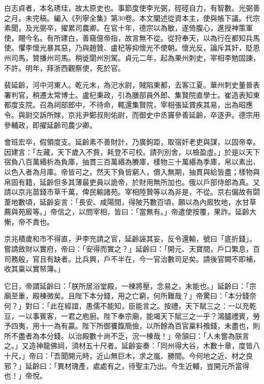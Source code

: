 
\begin{pinyinscope}

 白志貞者，本名琇珪，故太原史也。事節度使李光弼，硜硜自力，有智數。光弼善之月。未完稿。編入《列寧全集》第30卷。本文闡述從資本主，使與帳下議。代宗素聞，及光弼卒，擢累司農卿。在官十年，德宗以為敏，遂倚腹心，進授神策軍使，賜今名。有所建白，善窺億帝指，故言無不從。從狩奉天，以為行在都知兵馬使。懼李懷光暴其惡，乃與趙贊、盧杞等抑懷光不使朝。懷光反，論斥其奸，貶恩州司馬，贊播州司馬。稍徙閬州別駕。貞元二年，起為果州刺史，宰相李勉固諫，不許。明年，拜浙西觀察使，死於官。



 裴延齡，河中河東人。乾元末，為汜水尉，賊陷東都，去客江夏。華州刺史董晉表署判官，稍遷太常博士。盧杞秉政，引為膳部員外郎、集賢院直學士。崔造表知東都度支院。召為祠部郎中，不待命，輒還集賢院，宰相張延賞疾其易，出為昭應令。與尉交訴所賕，京兆尹鄭叔則佑尉，而御史中丞竇參善延齡，卒逐尹。德宗用參輔政，即擢延齡司農少卿。



 會班宏卒，假領度支。延齡素不善財計，乃廣鉤距，取宿奸老吏與謀，以固帝幸。因建言：「左藏，天下歲入不貲，耗登不可校。請列別舍，以檢盈虛。」於是以天下宿負八百萬緡析為負庫，抽貫三百萬緡為賸庫，樣物三十萬緡為季庫，帛以素出、以色入者為月庫。帝皆可之。然天下負皆窮人，償入無期，抽貫與給皆盡；樣物與帛固有籍，延齡但多其薄最吏員以詭帝，於財用無所加也。俄以戶部侍郎為真。又請以京兆苗錢市草千萬，俾民輸諸苑。宰相陸贄等以為非是，不從。京右偏故有閟葦地數頃，延齡妄言：「長安、咸陽間，得陂艿數百頃，願以為內廄牧地，水甘草薦與苑廄等。」帝信之，以問宰相，皆曰：「當無有。」帝遣使按覆，果詐。延齡大慚，帝不責也。



 京兆積歲和市不得直，尹李充請之官，延齡誣其妄，反令還輸，號曰「底折錢」。嘗請斂財以實府，帝曰：「安得而實之？」延齡曰：「開元、天寶間，戶口繁息，百司務殷，官且有缺者。比兵興，戶不半在，今一官治數司足矣。請後官闕不即補，收其稟以實帑簿。」



 它日，帝謂延齡曰：「朕所居浴堂殿，一棟將壓，念易之，未能也。」延齡曰：「宗廟至重，殿棟微矣。且陛下本分錢，用之亡窮，何所難哉？」帝驚曰：「本分錢奈何？」對曰：「此在經誼，愚儒不能知，臣能言之。按禮，天下賦三之：一以充乾豆，一以事賓客，一君之庖廚。陛下奉宗廟，能竭天下賦三之一乎？鴻臚禮賓，勞予四夷，用十一為有贏。陛下所御饔餼簡儉，以所餘為百官稟料飧錢，未盡也，則所不盡者為本分錢。以治殿數十尚不乏，況一棟哉！」帝頷曰：「人未嘗為朕言之。」又造神龍佛祠，須材五十尺者。延齡妄奏：「同州得大谷，木數十章，度皆八十尺，」帝曰：「吾聞開元時，近山無巨木，求之嵐、勝間。今何地之近、材之良邪？」延齡曰：「異材瑰產，處處有之，待聖主乃出。今生近輔，豈開元所當得也！」帝悅。




\end{pinyinscope}
